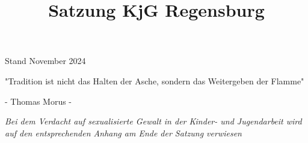 \documentclass[12pt]{report}
\title{Satzung KjG Regensburg}
\author{}
\begin{document}
 
  \begin{center}
    \pagestyle{empty}
    \BgThispage
    \vspace*{\fill}
    \begin{Huge}
      { \color{kjgtuerkis}  Stand November 2024}
    \end{Huge}
    \vspace*{\fill}
    \newpage
    \pagestyle{empty}
    \vspace*{\fill}
   { \selectfont
     \begin{Huge}
     "Tradition ist nicht das Halten der Asche, sondern das Weitergeben der Flamme"
     \end{Huge}
    }
    \newline
    \begin{large}
      - Thomas Morus -
    \end{large}
    \vspace*{\fill}
  \end{center}

  \tableofcontents
  \begin{flushleft}
   \it{ Bei dem Verdacht auf sexualisierte Gewalt in der Kinder- und Jugendarbeit wird auf den entsprechenden
        Anhang am Ende der Satzung verwiesen}
  \end{flushleft}
  \newpage  
  \setcounter{page}{1}
\end{document}
